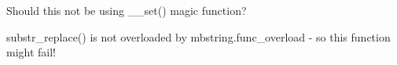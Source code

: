 
\begin{DoxyRefList}
\item[\label{todo__todo000001}%
\hypertarget{todo__todo000001}{}%
Global \hyperlink{class_p_h_p_mailer_a75ddddcb4fd8f092e42a3cf96c006066}{P\+H\+P\+Mailer\+:\+:set} (\$name, \$value= \textquotesingle{}\textquotesingle{})]Should this not be using \+\_\+\+\_\+set() magic function?  
\item[\label{todo__todo000002}%
\hypertarget{todo__todo000002}{}%
global\+Scope$>$ Global \hyperlink{outputfilter_8trimwhitespace_8php_a286d7ff1644ec213ed92af73546fb49f}{smarty\+\_\+outputfilter\+\_\+trimwhitespace} (\$source, \hyperlink{class_smarty___internal___template}{Smarty\+\_\+\+Internal\+\_\+\+Template} \$smarty)]substr\+\_\+replace() is not overloaded by mbstring.\+func\+\_\+overload -\/ so this function might fail! 
\end{DoxyRefList}